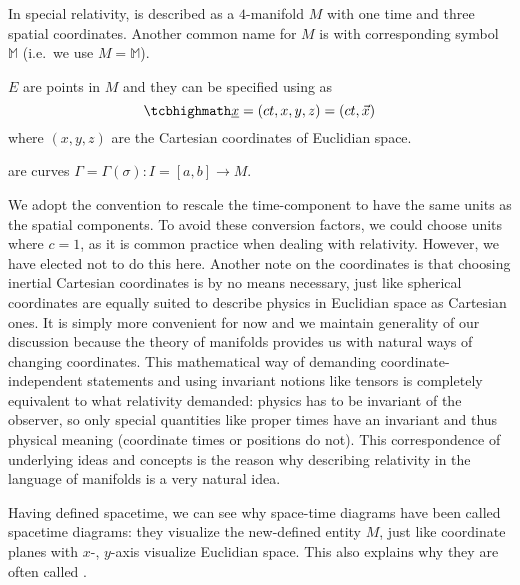 \begin{defi}
	In special relativity,  is described as a $4$-manifold $M$ with one time and three spatial coordinates. Another common name for $M$ is  with corresponding symbol $\mathbb{M}$ (i.e.~we use $M = \mathbb{M}$).

	 $E$ are points in $M$ and they can be specified using  as
	\begin{equation}
		\eqbox{
		\underline{x} = (ct, x, y, z) = (ct, \vec{x})
		}
	\end{equation}
	where $(x, y, z)$ are the Cartesian coordinates of Euclidian space.
	
	
	 are curves $\Gamma = \Gamma(\sigma): I = [a, b] \rightarrow M$.
\end{defi}
We adopt the convention to rescale the time-component to have the same units as the spatial components. To avoid these conversion factors, we could choose units where $c = 1$, as it is common practice when dealing with relativity. However, we have elected not to do this here. Another note on the coordinates is that choosing inertial Cartesian coordinates is by no means necessary, just like spherical coordinates are equally suited to describe physics in Euclidian space as Cartesian ones. It is simply more convenient for now and we maintain generality of our discussion because the theory of manifolds provides us with natural ways of changing coordinates. This mathematical way of demanding coordinate-independent statements and using invariant notions like tensors is completely equivalent to what relativity demanded: physics has to be invariant of the observer, so only special quantities like proper times have an invariant and thus physical meaning (coordinate times or positions do not). This correspondence of underlying ideas and concepts is the reason why describing relativity in the language of manifolds is a very natural idea.


Having defined spacetime, we can see why space-time diagrams have been called spacetime diagrams: they visualize the new-defined entity $M$, just like coordinate planes with $x$-, $y$-axis visualize Euclidian space. This also explains why they are often called .\\



